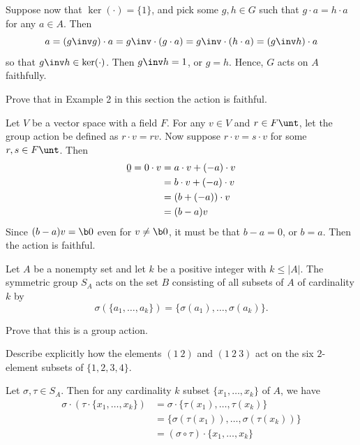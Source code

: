 \begin{problems}
\begin{sol}
        Suppose now that $\ker(\cdot) = \{1\}$, and pick some $g, h \in G$ such that $g \cdot a = h \cdot a$ for any $a \in A$. Then
        \[a = (g\inv g) \cdot a = g\inv \cdot (g \cdot a) = g\inv \cdot (h \cdot a) = (g\inv h) \cdot a\]
        so that $g\inv h \in \ker(\cdot)$. Then $g\inv h = 1$, or $g = h$. Hence, $G$ acts on $A$ faithfully.
    \end{sol}
    \item Prove that in Example 2 in this section the action is faithful.
    \begin{sol}
        Let $V$ be a vector space with a field $F$. For any $v \in V$ and $r \in F\unt$, let the group action be defined as $r \cdot v = rv$. Now suppose $r \cdot v = s \cdot v$ for some $r, s \in F\unt$. Then
        \begin{align*}
            \b 0 = 0 \cdot v & = a \cdot v + (-a) \cdot v \\
            & = b \cdot v + (-a) \cdot v \\
            & = (b + (-a)) \cdot v \\
            & = (b - a)v
        \end{align*}
        Since $(b - a)v = \b0$ even for $v \neq \b 0$, it must be that $b - a = 0$, or $b = a$. Then the action is faithful.
    \end{sol}
    \item Let $A$ be a nonempty set and let $k$ be a positive integer with $k\le |A|$. The symmetric group $S_A$ acts on the set $B$ consisting of all subsets of $A$ of cardinality $k$ by
    \[\sigma(\{a_1, \dots, a_k\}) = \{\sigma(a_1), \dots, \sigma(a_k)\}.\]
    \begin{problems}
        \item Prove that this is a group action.
        \item Describe explicitly how the elements $(1\ 2)$ and $(1\ 2\ 3)$ act on the six $2$-element subsets of $\{1,2,3,4\}$.
    \end{problems}
    \begin{solalph}
        \item Let $\sigma, \tau \in S_A$. Then for any cardinality $k$ subset $\{x_1, \ldots, x_k\}$ of $A$, we have
        \begin{align*}
            \sigma \cdot (\tau \cdot \{x_1, \ldots, x_k\}) & = \sigma \cdot \{\tau(x_1), \ldots, \tau(x_k)\} \\
            & = \{\sigma(\tau(x_1)), \ldots, \sigma(\tau(x_k))\} \\
            & = (\sigma \circ \tau) \cdot \{x_1, \ldots, x_k\}

\end{align*}
\end{solalph}
\end{problems}
